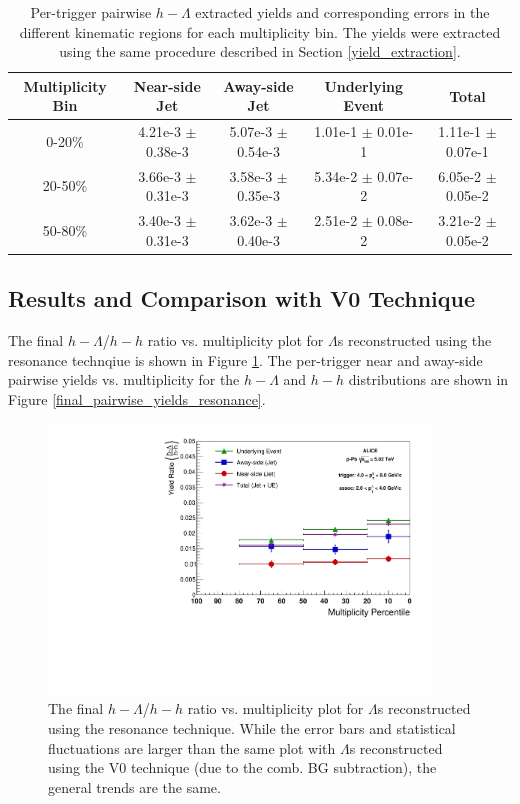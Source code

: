 \documentclass[ALICE,manyauthors]{ALICE_analysis_notes}
\begin{document}
\begin{itemize}
\begin{table}[h!]
\centering
\begin{tabular}{| c | c | c | c | c | }
\hline
Multiplicity Bin & Near-side Jet & Away-side Jet & Underlying Event & Total  \\
\hline
0-20\% & 4.21e-3 $\pm$ 0.38e-3 &  5.07e-3 $\pm$ 0.54e-3 & 1.01e-1 $\pm$ 0.01e-1 & 1.11e-1 $\pm$ 0.07e-1 \\
20-50\% & 3.66e-3 $\pm$ 0.31e-3 & 3.58e-3 $\pm$ 0.35e-3 & 5.34e-2 $\pm$ 0.07e-2 & 6.05e-2 $\pm$ 0.05e-2 \\
50-80\% & 3.40e-3 $\pm$ 0.31e-3 & 3.62e-3 $\pm$ 0.40e-3 & 2.51e-2 $\pm$ 0.08e-2 & 3.21e-2 $\pm$ 0.05e-2 \\
\hline
\end{tabular}
\caption{Per-trigger pairwise $h-\Lambda$ extracted yields and corresponding errors in the different kinematic regions for each multiplicity bin. The yields were extracted using the same procedure described in Section \ref{yield_extraction}.}
\label{yield_table_resonance}
\end{table}

\subsection{Results and Comparison with V0 Technique}
The final $h-\Lambda$/$h-h$ ratio vs. multiplicity plot for $\Lambda$s reconstructed using the resonance technqiue is shown in Figure \ref{final_ratio_resonance}. The per-trigger near and away-side pairwise yields vs. multiplicity for the $h-\Lambda$ and $h-h$ distributions are shown in Figure \ref{final_pairwise_yields_resonance}.

\begin{figure}[ht]
\centering
\includegraphics[width=4in]{figures/resonance_ratio_plot_2_4.pdf}
\caption{The final $h-\Lambda$/$h-h$ ratio vs. multiplicity plot for $\Lambda$s reconstructed using the resonance technique. While the error bars and statistical fluctuations are larger than the same plot with $\Lambda$s reconstructed using the V0 technique (due to the comb. BG subtraction), the general trends are the same.}
\label{final_ratio_resonance}
\end{figure}


\end{itemize}
\end{document}
